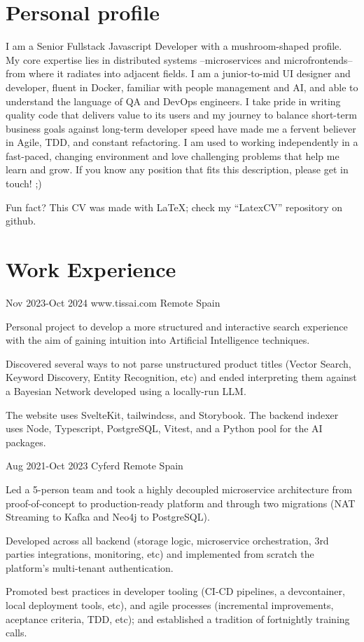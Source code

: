 \documentclass[10pt]{CurriculumVitae}
\begin{document}
  \makeheading

  \section{Personal profile}
    {
      I am a Senior Fullstack Javascript Developer with a mushroom-shaped profile.
      My core expertise lies in distributed systems –microservices and microfrontends– from where it radiates into adjacent fields. I am a junior-to-mid UI designer and developer, fluent in Docker, familiar with people management and AI, and able to understand the language of QA and DevOps engineers.
      I take pride in writing quality code that delivers value to its users and my journey to balance short-term business goals against long-term developer speed have made me a fervent believer in Agile, TDD, and constant refactoring.
      I am used to working independently in a fast-paced, changing environment and love challenging problems that help me learn and grow. If you know any position that fits this description, please get in touch! ;) 
      
      \null\hfill {\scriptsize Fun fact? This CV was made with LaTeX; check my ``LatexCV'' repository on github.}
    }


  \section{Work Experience}

      {Nov 2023-Oct 2024}
      {www.tissai.com}
      {Remote}
      {Spain}
      {
        \item Personal project to develop a more structured and interactive search experience with the aim of gaining intuition into Artificial Intelligence techniques.
        \item Discovered several ways to not parse unstructured product titles (Vector Search, Keyword Discovery, Entity Recognition, etc) and ended interpreting them against a Bayesian Network developed using a locally-run LLM.
        \item The website uses SvelteKit, tailwindcss, and Storybook. The backend indexer uses Node, Typescript, PostgreSQL, Vitest, and a Python pool for the AI packages.
      }

      {Aug 2021-Oct 2023}
      {Cyferd}
      {Remote}
      {Spain}
      {
        \item Led a 5-person team and took a highly decoupled microservice architecture from proof-of-concept to production-ready platform and through two migrations (NAT Streaming to Kafka and Neo4j to PostgreSQL).
        \item Developed across all backend (storage logic, microservice orchestration, 3rd parties integrations, monitoring, etc) and implemented from scratch the platform's multi-tenant authentication.
        \item Promoted best practices in developer tooling (CI-CD pipelines, a devcontainer, local deployment tools, etc), and agile processes (incremental improvements, aceptance criteria, TDD, etc); and established a tradition of fortnightly training calls.
      }
\end{document}
